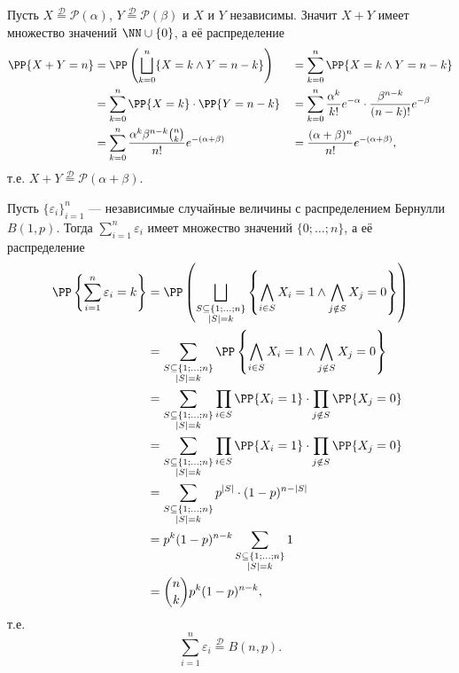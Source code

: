\documentclass[12pt,a4paper]{article}
\newcommand{\Deq}{\mathrel{\stackrel{\mathcal{D}}{=}}}
\begin{document}
    \begin{example}
        Пусть $X \Deq \mathcal{P}(\alpha)$, $Y \Deq \mathcal{P}(\beta)$ и $X$ и $Y$ независимы. Значит $X + Y$ имеет множество значений $\NN \cup \{0\}$, а её распределение
        \begin{align*}
            \PP\{X + Y = n\}
            &= \PP\left(\bigsqcup_{k=0}^n \{X = k \wedge Y = n-k\}\right)&
            &= \sum_{k=0}^n \PP\{X = k \wedge Y = n-k\}\\
            &= \sum_{k=0}^n \PP\{X = k\} \cdot \PP\{Y = n-k\}&
            &= \sum_{k=0}^n \frac{\alpha^k}{k!} e^{-\alpha} \cdot \frac{\beta^{n-k}}{(n-k)!} e^{-\beta}\\
            &= \sum_{k=0}^n \frac{\alpha^k \beta^{n-k} \binom{n}{k}}{n!} e^{-(\alpha + \beta)}&
            &= \frac{(\alpha + \beta)^n}{n!} e^{-(\alpha + \beta)},
        \end{align*}
        т.е. $X + Y \Deq \mathcal{P}(\alpha + \beta)$.
    \end{example}

    \begin{example}
        Пусть $\{\varepsilon_i\}_{i=1}^n$ --- независимые случайные величины с распределением Бернулли $B(1, p)$. Тогда $\sum_{i=1}^n \varepsilon_i$ имеет множество значений $\{0; \dots; n\}$, а её распределение
        \begin{align*}
            \PP\left\{\sum_{i=1}^n \varepsilon_i = k\right\}
            &= \PP\left(\bigsqcup_{\substack{S \subseteq \{1; \dots; n\}\\ |S| = k}} \left\{\bigwedge_{i \in S} X_i = 1 \wedge \bigwedge_{j \notin S} X_j = 0\right\}\right)\\
            &= \sum_{\substack{S \subseteq \{1; \dots; n\}\\ |S| = k}} \PP\left\{\bigwedge_{i \in S} X_i = 1 \wedge \bigwedge_{j \notin S} X_j = 0\right\}\\
            &= \sum_{\substack{S \subseteq \{1; \dots; n\}\\ |S| = k}} \prod_{i \in S} \PP\{X_i = 1\} \cdot \prod_{j \notin S} \PP\{X_j = 0\}\\
            &= \sum_{\substack{S \subseteq \{1; \dots; n\}\\ |S| = k}} \prod_{i \in S} \PP\{X_i = 1\} \cdot \prod_{j \notin S} \PP\{X_j = 0\}\\
            &= \sum_{\substack{S \subseteq \{1; \dots; n\}\\ |S| = k}} p^{|S|} \cdot (1-p)^{n-|S|}\\
            &= p^k (1-p)^{n-k} \sum_{\substack{S \subseteq \{1; \dots; n\}\\ |S| = k}} 1\\
            &= \binom{n}{k} p^k (1-p)^{n-k},
        \end{align*}
        т.е.
        \[\sum_{i=1}^n \varepsilon_i \Deq B(n, p).\]
    \end{example}
\end{document}
